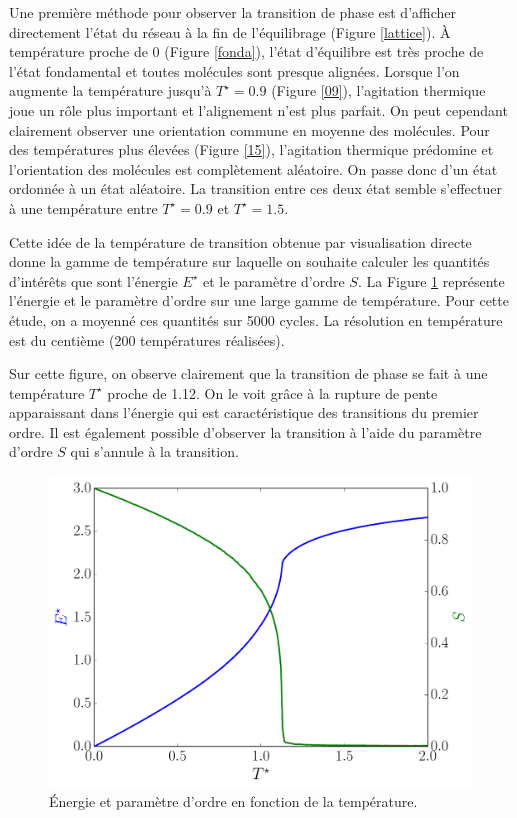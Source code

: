 \documentclass[11pt,a4paper]{article}
\numberwithin{equation}{section}
\begin{document}
Une première méthode pour observer la transition de phase est d'afficher directement l'état du réseau à la fin de l'équilibrage (Figure \ref{lattice}). À température proche de 0 (Figure \ref{fonda}), l'état d'équilibre est très proche de l'état fondamental et toutes molécules sont presque alignées. Lorsque l'on augmente la température jusqu'à $T^\star = 0.9$ (Figure \ref{09}), l'agitation thermique joue un rôle plus important et l'alignement n'est plus parfait. On peut cependant clairement observer une orientation commune en moyenne des molécules. Pour des températures plus élevées (Figure \ref{15}), l'agitation thermique prédomine et l'orientation des molécules est complètement aléatoire.
On passe donc d'un état ordonnée à un état aléatoire. La transition entre ces deux état semble s'effectuer à une température entre $T^\star = 0.9$ et $T^\star = 1.5$. 
\medskip

Cette idée de la température de transition obtenue par visualisation directe donne la gamme de température sur laquelle on souhaite calculer les quantités d'intérêts que sont l'énergie $E^\star$ et le paramètre d'ordre $S$.  La Figure \ref{global} représente l'énergie et le paramètre d'ordre sur une large gamme de température. Pour cette étude, on a moyenné ces quantités sur 5000 cycles. La résolution en température est du centième (200 températures réalisées).
\medskip

Sur cette figure, on observe clairement que la transition de phase se fait à une température $T^\star$ proche de 1.12. On le voit grâce à la rupture de pente apparaissant dans l'énergie qui est caractéristique des transitions du premier ordre. Il est également possible d'observer la transition à l'aide du paramètre d'ordre $S$ qui s'annule à la transition.

\begin{figure}[h!]
    \centering	    
	\includegraphics[scale=0.6]{figures/global.pdf}
    \caption{Énergie et paramètre d'ordre en fonction de la température.}
    	\label{global} 
\end{figure}
\end{document}
